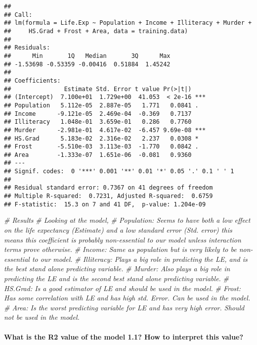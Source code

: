 \documentclass[
]{article}
\newenvironment{Shaded}{\begin{snugshade}}{\end{snugshade}}
\newcommand{\CommentTok}[1]{\textcolor[rgb]{0.56,0.35,0.01}{\textit{#1}}}
\begin{document}
\begin{verbatim}
## 
## Call:
## lm(formula = Life.Exp ~ Population + Income + Illiteracy + Murder + 
##     HS.Grad + Frost + Area, data = training.data)
## 
## Residuals:
##      Min       1Q   Median       3Q      Max 
## -1.53698 -0.53359 -0.00416  0.51884  1.45242 
## 
## Coefficients:
##               Estimate Std. Error t value Pr(>|t|)    
## (Intercept)  7.100e+01  1.729e+00  41.053  < 2e-16 ***
## Population   5.112e-05  2.887e-05   1.771   0.0841 .  
## Income      -9.121e-05  2.469e-04  -0.369   0.7137    
## Illiteracy   1.048e-01  3.659e-01   0.286   0.7760    
## Murder      -2.981e-01  4.617e-02  -6.457 9.69e-08 ***
## HS.Grad      5.183e-02  2.316e-02   2.237   0.0308 *  
## Frost       -5.510e-03  3.113e-03  -1.770   0.0842 .  
## Area        -1.333e-07  1.651e-06  -0.081   0.9360    
## ---
## Signif. codes:  0 '***' 0.001 '**' 0.01 '*' 0.05 '.' 0.1 ' ' 1
## 
## Residual standard error: 0.7367 on 41 degrees of freedom
## Multiple R-squared:  0.7231, Adjusted R-squared:  0.6759 
## F-statistic:  15.3 on 7 and 41 DF,  p-value: 1.204e-09
\end{verbatim}

\begin{Shaded}
\begin{Highlighting}[]
\CommentTok{\# Results}
\CommentTok{\# Looking at the model,}
\CommentTok{\# Population: Seems to have both a low effect on the life expectancy (Estimate) and a low standard error (Std. error) this means this coefficient is probably non{-}essential to our model unless interaction terms prove otherwise.}
\CommentTok{\# Income: Same as population but is very likely to be non{-}essential to our model.}
\CommentTok{\# Illiteracy: Plays a big role in predicting the LE, and is the best stand alone predicting variable.}
\CommentTok{\# Murder: Also plays a big role in predicting the LE and is the second best stand alone predicting variable.}
\CommentTok{\# HS.Grad: Is a good estimator of LE and should be used in the model.}
\CommentTok{\# Frost: Has some correlation with LE and has high std. Error. Can be used in the model.}
\CommentTok{\# Area: Is the worst predicting variable for LE and has very high error. Should not be used in the model.}
\end{Highlighting}
\end{Shaded}

\hypertarget{what-is-the-r2-value-of-the-model-1.1-how-to-interpret-this-value}{%
\paragraph{What is the R2 value of the model 1.1? How to interpret this
value?}\label{what-is-the-r2-value-of-the-model-1.1-how-to-interpret-this-value}}
\end{document}
